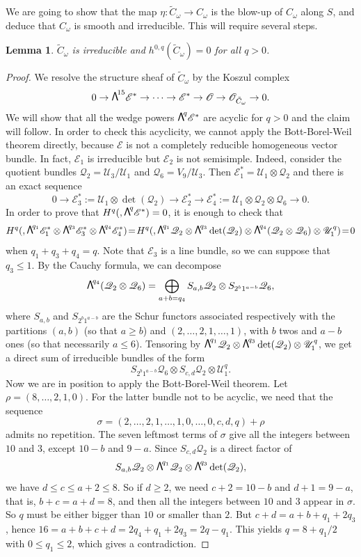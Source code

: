 \documentclass[JEP,XML,SOM,Unicode,NoEqCountersInSection]{cedram}
\newcommand{\NoChangel}[1]{%
\expandafter\let\csname old\string#1\endcsname=#1
\let#1=\relax
\newcommand{#1}{\mathcode`l="716C\csname old\string#1\endcsname\mathcode`l="7160 }%
}
\newcommand\bw[1]{{\hbox{\large$\mathsf{\Lambda}$}^{\!#1}}}
\let\mathcal\mathscr
\theoremstyle{plain}
\newtheorem{lemma}[theorem]{Lemma}
\theoremstyle{definition}
\DeclareMathOperator{\Fl}{Fl}\NoChangel{\Fl}
\newcommand{\sheaf}[1]{\mathcal{#1}}
\newcommand{\ke}{\sheaf{E}}
\newcommand{\ko}{\sheaf{O}}\let\OO\ko\let\cO\ko
\newcommand{\kq}{\sheaf{Q}}
\newcommand{\ku}{\sheaf{U}}
\begin{document}
We are going to show that the map $\eta: \tilde{C}_{\omega} \to C_\omega$ is the blow-up of $C_\omega$ along $S$,
and deduce that $C_\omega$ is smooth and irreducible. This will require several steps.

\begin{lemma}\label{van}
$\tilde C_\omega$ is irreducible and $h^{0,q}(\tilde C_\omega)=0$ for all $q>0$.
\end{lemma}

\begin{proof}
We resolve the structure sheaf of $\tilde C_\omega$ by the Koszul complex
\begin{equation*}\label{koszulctilde}
0\to \bw{15}\ke^*\to\cdots \to \ke^*\to\ko_{\Fl}\to \ko_{\tilde C_\omega}\to 0.
\end{equation*}
We will show that all the wedge powers $\bw{q}\ke^*$ are acyclic for $q>0$ and the claim will follow.
In order to check this acyclicity, we cannot apply the Bott-Borel-Weil theorem directly, because $\ke$ is not a completely reducible
homogeneous vector bundle. In fact, $\ke_1$ is irreducible but $\ke_2$ is not semisimple. Indeed, consider the
quotient bundles $\kq_2=\ku_3/\ku_1$ and $\kq_6=V_9/\ku_3$. Then $\ke_1^*=\ku_1\otimes \kq_2$ and there is an exact sequence
\[
 0\to \ke_3^*:=\ku_1\otimes \det(\kq_2)\to \ke_2^*\to \ke_4^*:=\ku_1\otimes \kq_2\otimes \kq_6\to 0.
\]
In order to prove that $H^q(\Fl,\bw{q}\ke^*)=0$, it is enough to check that
\[
H^q(\Fl,\bw{q_1}\ke_1^*\otimes\bw{q_3}\ke_3^*\otimes \bw{q_4}\ke_4^*)\!=\!
H^q(\Fl,\bw{q_1}\kq_2\otimes\bw{q_3}\det(\kq_2)\otimes \bw{q_4}(\kq_2\otimes \kq_6)\otimes \ku_1^q)\!=\!0
\]
when $q_1+q_3+q_4=q$. Note that $\ke_3$ is a line bundle, so we can suppose that $q_3\le 1$.
By the Cauchy formula, we can decompose
\[
\bw{q_4}(\kq_2\otimes \kq_6)=\bigoplus_{a+b=q_4}S_{a,b}\kq_2\otimes S_{2^b1^{a-b}}\kq_6,
\]
where $S_{a,b}$ and $S_{2^b1^{a-b}}$ are the Schur functors associated respectively with the partitions
$(a,b)$ (so that $a\ge b$) and $(2,\ldots ,2,1,\ldots ,1)$, with $b$ twos and $a-b$ ones (so that necessarily $a\le 6$). Tensoring by
$\bw{q_1}\kq_2\otimes\bw{q_3}\det(\kq_2)\otimes \ku_1^q$, we get a direct sum of irreducible bundles
of the form
\[
S_{2^b1^{a-b}}\kq_6\otimes S_{c,d}\kq_2\otimes \ku_1^q.
\]
Now we are in position to apply the Bott-Borel-Weil theorem. Let $\rho=(8,\ldots ,2,1,0)$. For the latter bundle not
to be acyclic, we need that the sequence \[
\sigma =(2,\ldots ,2,1,\ldots ,1,0,\ldots ,0,c,d,q)+\rho
\]
admits no repetition. The seven leftmost terms of $\sigma$ give all the integers between $10$ and $3$, except
$10-b$ and $9-a$. Since $S_{c,d}\kq_2$ is a direct factor of
\[
S_{a,b}\kq_2\otimes \bw{q_1}\kq_2\otimes\bw{q_3}\det(\kq_2),
\]
we have $d\le c\le a+2\le 8$. So if $d\ge 2$, we need $c+2=10-b$ and $d+1=9-a$, that is, $b+c=a+d=8$, and then all
the integers between $10$ and $3$ appear in $\sigma$. So $q$ must be either bigger than $10$ or smaller than $2$.
But $c+d=a+b+q_1+2q_3$, hence $16=a+b+c+d=2q_4+q_1+2q_3=2q-q_1$. This yields $q=8+q_1/2$ with $0\le q_1\le 2$, which
gives a contradiction.


\end{proof}
\end{document}
